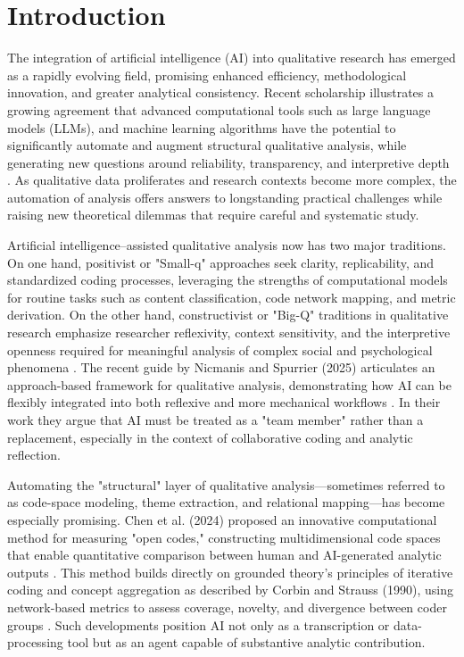 \documentclass[letterpaper,10pt]{article}
\begin{document}
\section{Introduction}

The integration of artificial intelligence (AI) into qualitative research has emerged as a rapidly evolving field, promising enhanced efficiency, methodological innovation, and greater analytical consistency. Recent scholarship illustrates a growing agreement that advanced computational tools such as large language models (LLMs), and machine learning algorithms have the potential to significantly automate and augment structural qualitative analysis, while generating new questions around reliability, transparency, and interpretive depth \cite{Nicmanis2025, Parfenova2024}. As qualitative data proliferates and research contexts become more complex, the automation of analysis offers answers to longstanding practical challenges while raising new theoretical dilemmas that require careful and systematic study.

Artificial intelligence–assisted qualitative analysis now has two major traditions. On one hand, positivist or "Small-q" approaches seek clarity, replicability, and standardized coding processes, leveraging the strengths of computational models for routine tasks such as content classification, code network mapping, and metric derivation. On the other hand, constructivist or "Big-Q" traditions in qualitative research emphasize researcher reflexivity, context sensitivity, and the interpretive openness required for meaningful analysis of complex social and psychological phenomena \cite{Nicmanis2025, BraunClarke2006}. The recent guide by Nicmanis and Spurrier (2025) articulates an approach-based framework for qualitative analysis, demonstrating how AI can be flexibly integrated into both reflexive and more mechanical workflows \cite{Nicmanis2025}. In their work they argue that AI must be treated as a "team member" rather than a replacement, especially in the context of collaborative coding and analytic reflection.

Automating the "structural" layer of qualitative analysis—sometimes referred to as code-space modeling, theme extraction, and relational mapping—has become especially promising. Chen et al. (2024) proposed an innovative computational method for measuring "open codes," constructing multidimensional code spaces that enable quantitative comparison between human and AI-generated analytic outputs \cite{Chen2024}. This method builds directly on grounded theory's principles of iterative coding and concept aggregation as described by Corbin and Strauss (1990), using network-based metrics to assess coverage, novelty, and divergence between coder groups \cite{CorbinStrauss1990}. Such developments position AI not only as a transcription or data-processing tool but as an agent capable of substantive analytic contribution.
\end{document}
